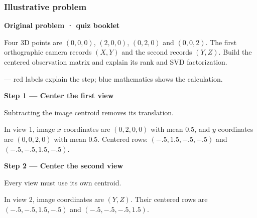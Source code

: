 \documentclass[letterpaper,11pt,english,openany,oneside]{jupyterBook}
\begin{document}
\subsubsection{Illustrative problem}
\label{\detokenize{lectures/lecture06/quiz-workbook:quiz-a7-q1}}\label{\detokenize{lectures/lecture06/quiz-workbook:id3}}
\par\medskip\textbf{Original problem · quiz booklet}\par\smallskip

\sphinxAtStartPar
Four 3D points are \((0,0,0)\), \((2,0,0)\), \((0,2,0)\) and \((0,0,2)\). The first orthographic camera records \((X,Y)\) and the second records \((Y,Z)\). Build the centered observation matrix and explain its rank and SVD factorization.

\par\medskip

\sphinxAtStartPar
{} — red labels explain the step; blue mathematics shows the calculation.

\par\medskip{}
{\color{QuizStepRed}\bfseries Step 1 — Center the first view}\par\smallskip

\sphinxAtStartPar
{} Subtracting the image centroid removes its translation.

\sphinxAtStartPar
In view 1, image {\color{QuizMathBlue} \(x\)} coordinates are {\color{QuizMathBlue} \((0,2,0,0)\)} with mean {\color{QuizMathBlue} \(0.5\)}, and {\color{QuizMathBlue} \(y\)} coordinates are {\color{QuizMathBlue} \((0,0,2,0)\)} with mean {\color{QuizMathBlue} \(0.5\)}. Centered rows: {\color{QuizMathBlue} \((-.5,1.5,-.5,-.5)\)} and {\color{QuizMathBlue} \((-.5,-.5,1.5,-.5)\)}.

\par

\par\medskip{}
{\color{QuizStepRed}\bfseries Step 2 — Center the second view}\par\smallskip

\sphinxAtStartPar
{} Every view must use its own centroid.

\sphinxAtStartPar
In view 2, image coordinates are {\color{QuizMathBlue} \((Y,Z)\)}. Their centered rows are {\color{QuizMathBlue} \((-.5,-.5,1.5,-.5)\)} and {\color{QuizMathBlue} \((-.5,-.5,-.5,1.5)\)}.

\par
\end{document}
